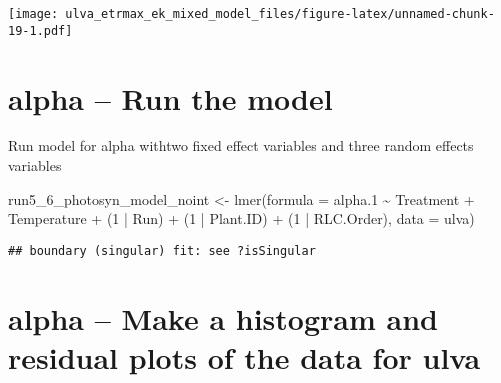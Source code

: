 \documentclass[
]{article}
\newenvironment{Shaded}{\begin{snugshade}}{\end{snugshade}}
\newcommand{\AttributeTok}[1]{\textcolor[rgb]{0.77,0.63,0.00}{#1}}
\newcommand{\ConstantTok}[1]{\textcolor[rgb]{0.00,0.00,0.00}{#1}}
\newcommand{\DecValTok}[1]{\textcolor[rgb]{0.00,0.00,0.81}{#1}}
\newcommand{\FloatTok}[1]{\textcolor[rgb]{0.00,0.00,0.81}{#1}}
\newcommand{\FunctionTok}[1]{\textcolor[rgb]{0.00,0.00,0.00}{#1}}
\newcommand{\NormalTok}[1]{#1}
\newcommand{\OtherTok}[1]{\textcolor[rgb]{0.56,0.35,0.01}{#1}}
\newcommand{\SpecialCharTok}[1]{\textcolor[rgb]{0.00,0.00,0.00}{#1}}
\newcommand{\StringTok}[1]{\textcolor[rgb]{0.31,0.60,0.02}{#1}}
\begin{document}
\texttt{[image: ulva\_etrmax\_ek\_mixed\_model\_files/figure-latex/unnamed-chunk-19-1.pdf]}

\hypertarget{alpha-run-the-model}{%
\section{alpha -- Run the model}\label{alpha-run-the-model}}

Run model for alpha withtwo fixed effect variables and three random
effects variables

\begin{Shaded}
\begin{Highlighting}[]
\NormalTok{run5\_6\_photosyn\_model\_noint }\OtherTok{\textless{}{-}} \FunctionTok{lmer}\NormalTok{(}\AttributeTok{formula =}\NormalTok{ alpha}\FloatTok{.1} \SpecialCharTok{\textasciitilde{}}\NormalTok{ Treatment }\SpecialCharTok{+}\NormalTok{ Temperature }
                                    \SpecialCharTok{+}\NormalTok{ (}\DecValTok{1} \SpecialCharTok{|}\NormalTok{ Run) }\SpecialCharTok{+}\NormalTok{ (}\DecValTok{1} \SpecialCharTok{|}\NormalTok{ Plant.ID) }\SpecialCharTok{+}\NormalTok{ (}\DecValTok{1} \SpecialCharTok{|}\NormalTok{ RLC.Order), }
                                    \AttributeTok{data =}\NormalTok{ ulva)}
\end{Highlighting}
\end{Shaded}

\begin{verbatim}
## boundary (singular) fit: see ?isSingular
\end{verbatim}

\hypertarget{alpha-make-a-histogram-and-residual-plots-of-the-data-for-ulva}{%
\section{alpha -- Make a histogram and residual plots of the data for
ulva}\label{alpha-make-a-histogram-and-residual-plots-of-the-data-for-ulva}}

\begin{Shaded}
\end{Shaded}
\end{document}
